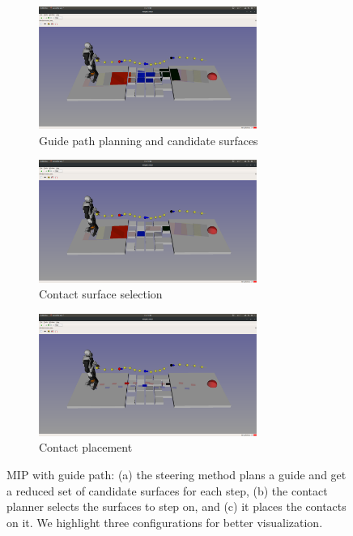 \begin{figure}[h!]
    \centering
    \captionsetup[subfigure]{justification=centering}
    \begin{subfigure}[t]{0.7\linewidth}
        \includegraphics[trim={10cm 8cm 10cm 10cm},clip,width=\textwidth,height=4cm]{Figures/Chapter_MIP_SL1M/rubbles/rubbles_steps_4_9_14.png}
        \caption{Guide path planning and candidate surfaces\label{fig:rubbles:surf_sel_0}}
    \end{subfigure}
    \begin{subfigure}[t]{0.7\linewidth}
        \includegraphics[trim={10cm 8cm 10cm 10cm},clip,width=\textwidth,height=4cm]{Figures/Chapter_MIP_SL1M/rubbles/rubbles_steps_4_9_14_selected.png}
        \caption{Contact surface selection\label{fig:rubbles:surf_sel_1}}
    \end{subfigure}
    \begin{subfigure}[t]{0.7\linewidth}
        \includegraphics[trim={10cm 8cm 10cm 10cm},clip,width=\textwidth,height=4cm]{Figures/Chapter_MIP_SL1M/rubbles/rubbles_steps_4_9_14_steps.png}
        \caption{Contact placement\label{fig:rubbles:surf_sel_2}}
    \end{subfigure}
    \caption{MIP with guide path: (a) the steering method plans a guide and get a reduced set of candidate surfaces for each step, (b) the contact planner selects the surfaces to step on, and (c) it places the contacts on it. We highlight three configurations for better visualization.\label{fig:rubbles:surf_sel}}
\end{figure}



